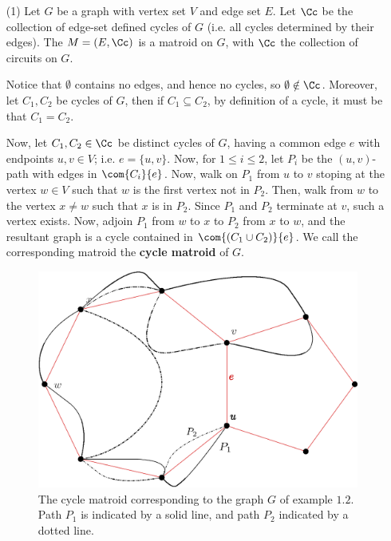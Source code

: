 \begin{example}\label{1.5}
    \begin{enumerate}
        \item[(1)] Let $G$ be a graph with vertex set $V$ and edge set  $E$. Let
            $\Cc$ be the collection of edge-set defined cycles of  $G$  (i.e.
            all cycles determined by their edges). The $M=(E,\Cc)$ is a matroid
            on $G$, with  $\Cc$ the collection of circuits on $G$.

            Notice that $\emptyset$ contains no edges, and hence no cycles, so
            $\emptyset \notin \Cc$. Moreover, let $C_1,C_2$ be cycles of $G$,
            then if  $C_1 \subseteq C_2$, by definition of a cycle, it must be
            that $C_1=C_2$.

            Now, let $C_1,C_2 \in \Cc$ be distinct cycles of $G$, having a
            common edge  $e$ with endpoints  $u,v \in V$; i.e.  $e=\{u,v\}$.
            Now, for $1 \leq i \leq 2$, let  $P_i$ be the  $(u,v)$-path with
            edges in $\com{C_i}{e}$. Now, walk on $P_1$ from $u$ to $v$ stoping
            at the vertex $w \in V$ such that  $w$ is the first vertex not in
            $P_2$. Then, walk from $w$ to the vertex  $x \neq w$ such that $x$
            is in  $P_2$. Since $P_1$ and $P_2$ terminate at $v$, such a vertex
            exists. Now, adjoin  $P_1$ from $w$ to  $x$ to  $P_2$ from $x$ to
            $w$, and the resultant graph is a cycle  contained in  $\com{(C_1
            \cup C_2)}{e}$. We call the corresponding matroid the \textbf{cycle
            matroid} of $G$.

            \begin{figure}[h]
                \centering
                \includegraphics[scale=0.5]{Figures/chapter1/cycle_matroid.eps}
                \caption{The cycle matroid corresponding to the graph $G$ of
                example $1.2$. Path $P_1$ is indicated by a solid line, and path
                $P_2$ indicated by a dotted line.}
                \label{fig_1.1}
            \end{figure}


\end{enumerate}
\end{example}
